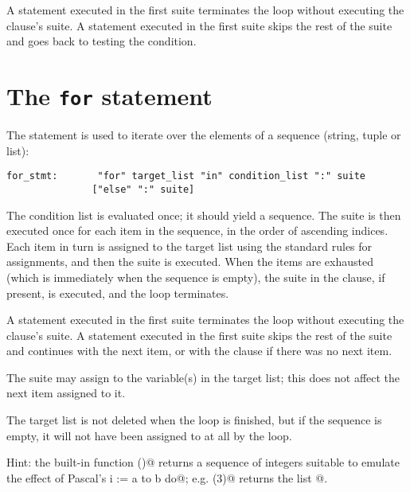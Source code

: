 A \verb@break@ statement executed in the first suite terminates the
loop without executing the \verb@else@ clause's suite.  A
\verb@continue@ statement executed in the first suite skips the rest
of the suite and goes back to testing the condition.

\section{The {\tt for} statement}

The \verb@for@ statement is used to iterate over the elements of a
sequence (string, tuple or list):

\begin{verbatim}
for_stmt:       "for" target_list "in" condition_list ":" suite
               ["else" ":" suite]
\end{verbatim}

The condition list is evaluated once; it should yield a sequence.  The
suite is then executed once for each item in the sequence, in the
order of ascending indices.  Each item in turn is assigned to the
target list using the standard rules for assignments, and then the
suite is executed.  When the items are exhausted (which is immediately
when the sequence is empty), the suite in the \verb@else@ clause, if
present, is executed, and the loop terminates.

A \verb@break@ statement executed in the first suite terminates the
loop without executing the \verb@else@ clause's suite.  A
\verb@continue@ statement executed in the first suite skips the rest
of the suite and continues with the next item, or with the \verb@else@
clause if there was no next item.

The suite may assign to the variable(s) in the target list; this does
not affect the next item assigned to it.

The target list is not deleted when the loop is finished, but if the
sequence is empty, it will not have been assigned to at all by the
loop.

Hint: the built-in function \verb@range()@ returns a sequence of
integers suitable to emulate the effect of Pascal's
\verb@for i := a to b do@;
e.g. \verb@range(3)@ returns the list \verb@[0, 1, 2]@.

